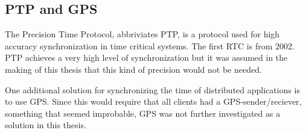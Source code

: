 \subsection{PTP and GPS}

The Precision Time Protocol, abbriviates PTP, is a protocol used for high accuracy synchronization in time critical systems. The first RTC is from 2002. PTP achieves a very high level of synchronization but it was assumed in the making of this thesis that this kind of precision would not be needed. 

One additional solution for synchronizing the time of distributed applications is to use GPS. Since this would require that all clients had a GPS-sender/reciever, something that seemed improbable, GPS was not further investigated as a solution in this thesis. 
